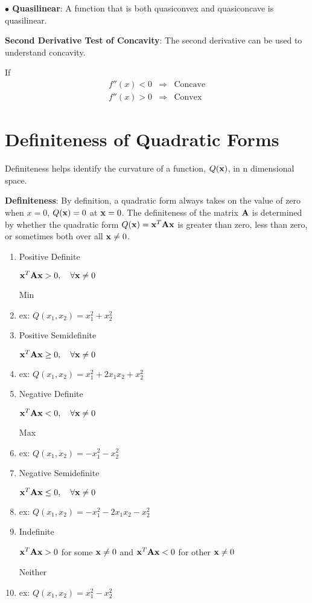 \documentclass[]{book}
\theoremstyle{definition}
\theoremstyle{definition}
\theoremstyle{definition}
\theoremstyle{remark}
\begin{document}
\parbox[c]{5in}{{\bf $\bullet$ Quasilinear}: A function that is both quasiconvex and quasiconcave is quasilinear.}

\begin{comment}
  \parbox{1.8in}{\texttt{[image: Quasilinear.pdf]}}\\
\end{comment}

\textbf{Second Derivative Test of Concavity}: The second derivative can
be used to understand concavity.

If \[\begin{array}{lll}
f''(x) < 0 & \Rightarrow & \text{Concave}\\
f''(x) > 0 & \Rightarrow & \text{Convex}
\end{array}\]

\section{Definiteness of Quadratic
Forms}\label{definiteness-of-quadratic-forms}

Definiteness helps identify the curvature of a function, \(Q({\bf x})\),
in n dimensional space.

\textbf{Definiteness}: By definition, a quadratic form always takes on
the value of zero when \(x = 0\), \(Q({\bf x})=0\) at \({\bf x}=0\). The
definiteness of the matrix \({\bf A}\) is determined by whether the
quadratic form \(Q({\bf x})={\bf x}^T{\bf A}{\bf x}\) is greater than
zero, less than zero, or sometimes both over all \({\bf x}\ne 0\).

\begin{enumerate}
  \item \parbox[t]{2in}{Positive Definite}
  \parbox[t]{2in}{${\bf x}^T{\bf A}{\bf x}>0, \quad \forall {\bf x}\ne 0$} \quad  Min
    \item[] ex: $Q(x_1,x_2) = x_1^2 + x_2^2$
  \item \parbox[t]{2in}{Positive Semidefinite}
  \parbox[t]{2in}{${\bf x}^T{\bf A}{\bf x}\ge 0, \quad \forall {\bf x}\ne 0$}
    \item[] ex: $Q(x_1,x_2) = x_1^2 + 2x_1x_2 + x_2^2$
  \item \parbox[t]{2in}{Negative Definite}
  \parbox[t]{2in}{${\bf x}^T{\bf A}{\bf x}<0, \quad \forall {\bf x}\ne 0$}  \quad Max
    \item[] ex: $Q(x_1,x_2) = -x_1^2 - x_2^2$
  \item \parbox[t]{2in}{Negative Semidefinite}
  \parbox[t]{2in}{${\bf x}^T{\bf A}{\bf x}\le 0, \quad \forall {\bf x}\ne 0$}
    \item[] ex: $Q(x_1,x_2) = - x_1^2 -2x_1x_2 - x_2^2$
  \item \parbox[t]{2in}{Indefinite}
  \parbox[t]{2in}{${\bf x}^T{\bf A}{\bf x}>0$ for some ${\bf x}\ne 0$ and ${\bf x}^T{\bf A}{\bf x}<0$ for
other ${\bf x}\ne 0$} \quad Neither
    \item[] ex: $Q(x_1,x_2) = x_1^2 - x_2^2$\\\\
\end{enumerate}
\end{document}
